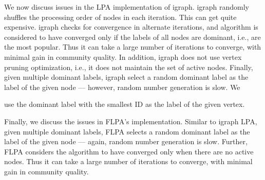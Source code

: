 We now discuss issues in the LPA implementation of igraph. igraph randomly shuffles the processing order of nodes in each iteration. This can get quite expensive. igraph checks for convergence in alternate iterations, and algorithm is considered to have converged only if the labels of all nodes are dominant, i.e., are the most popular. Thus it can take a large number of iterations to converge, with minimal gain in community quality. In addition, igraph does not use vertex pruning optimization, i.e., it does not maintain the set of active nodes. Finally, given multiple dominant labels, igraph select a random dominant label as the label of the given node --- however, random number generation is slow. We use the dominant label with the smallest ID as the label of the given vertex.

Finally, we discuss the issues in FLPA's implementation. Similar to igraph LPA, given multiple dominant labels, FLPA selects a random dominant label as the label of the given node --- again, random number generation is slow. Further, FLPA considers the algorithm to have converged only when there are no active nodes. Thus it can take a large number of iterations to converge, with minimal gain in community quality.




